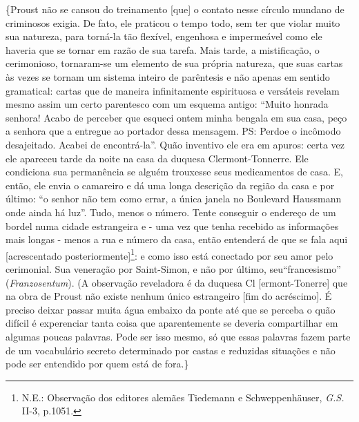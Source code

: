 \{Proust não se cansou do treinamento {[}que{]} o contato nesse círculo
mundano de criminosos exigia. De fato, ele praticou o tempo todo, sem
ter que violar muito sua natureza, para torná-la tão flexível, engenhosa
e impermeável como ele haveria que se tornar em razão de sua tarefa.
Mais tarde, a mistificação, o cerimonioso, tornaram-se um elemento de
sua própria natureza, que suas cartas às vezes se tornam um sistema
inteiro de parêntesis e não apenas em sentido gramatical: cartas que de
maneira infinitamente espirituosa e versáteis revelam mesmo assim um
certo parentesco com um esquema antigo: ``Muito honrada senhora! Acabo
de perceber que esqueci ontem minha bengala em sua casa, peço a senhora
que a entregue ao portador dessa mensagem. PS: Perdoe o incômodo
desajeitado. Acabei de encontrá-la''. Quão inventivo ele era em apuros:
certa vez ele apareceu tarde da noite na casa da duquesa
Clermont-Tonnerre. Ele condiciona sua permanência se alguém trouxesse
seus medicamentos de casa. E, então, ele envia o camareiro e dá uma
longa descrição da região da casa e por último: ``o senhor não tem como
errar, a única janela no Boulevard Haussmann onde ainda há luz''. Tudo,
menos o número. Tente conseguir o endereço de um bordel numa cidade
estrangeira e - uma vez que tenha recebido as informações mais longas -
menos a rua e número da casa, então entenderá de que se fala aqui
{[}acrescentado posteriormente{]}\footnote{N.E.: Observação dos editores
  alemães Tiedemann e Schweppenhäuser, \emph{G.S.} II-3, p.1051.}: e
como isso está conectado por seu amor pelo cerimonial. Sua veneração por
Saint-Simon, e não por último, seu``francesismo'' (\emph{Franzosentum}).
(A observação reveladora é da duquesa Cl {[}ermont-Tonerre{]} que na
obra de Proust não existe nenhum único estrangeiro {[}fim do
acréscimo{]}. É preciso deixar passar muita água embaixo da ponte até
que se perceba o quão difícil é experenciar tanta coisa que
aparentemente se deveria compartilhar em algumas poucas palavras. Pode
ser isso mesmo, só que essas palavras fazem parte de um vocabulário
secreto determinado por castas e reduzidas situações e não pode ser
entendido por quem está de fora.\}

